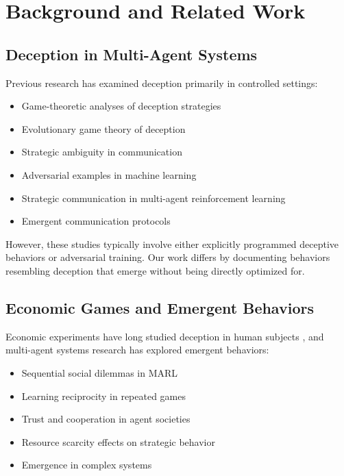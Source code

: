 \documentclass[10pt,twocolumn]{article}
\begin{document}
\section{Background and Related Work}

\subsection{Deception in Multi-Agent Systems}

Previous research has examined deception primarily in controlled settings:
\begin{itemize}
\item Game-theoretic analyses of deception strategies \cite{crawford1982strategic,ettinger2010theory}
\item Evolutionary game theory of deception \cite{vincent2013evolutionary}
\item Strategic ambiguity in communication \cite{chen2011strategic}
\item Adversarial examples in machine learning \cite{goodfellow2014explaining}
\item Strategic communication in multi-agent reinforcement learning \cite{foerster2016learning}
\item Emergent communication protocols \cite{peysakhovich2018prosocial}
\end{itemize}

However, these studies typically involve either explicitly programmed deceptive behaviors or adversarial training. Our work differs by documenting behaviors resembling deception that emerge without being directly optimized for.

\subsection{Economic Games and Emergent Behaviors}

Economic experiments have long studied deception in human subjects \cite{gneezy2005deception,sutter2009deception}, and multi-agent systems research has explored emergent behaviors:
\begin{itemize}
\item Sequential social dilemmas in MARL \cite{leibo2017multi}
\item Learning reciprocity in repeated games \cite{eccles2019learning}
\item Trust and cooperation in agent societies \cite{ostrom1990governing}
\item Resource scarcity effects on strategic behavior
\item Emergence in complex systems \cite{holland1998emergence}
\end{itemize}
\end{document}
